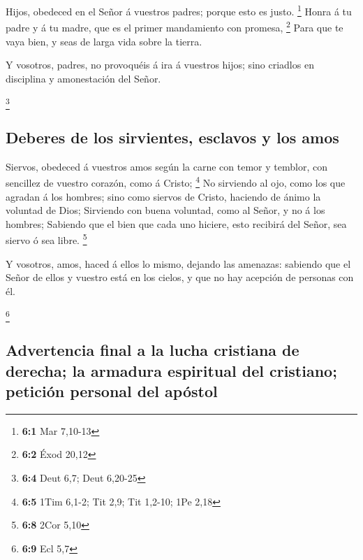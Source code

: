  Hijos, obedeced en el Señor á vuestros padres; porque esto
es justo. \footnote{\textbf{6:1} Mar 7,10-13}  Honra á tu
padre y á tu madre, que es el primer mandamiento con promesa,
\footnote{\textbf{6:2} Éxod 20,12}  Para que te vaya bien, y
seas de larga vida sobre la tierra.

 Y vosotros, padres, no provoquéis á ira á vuestros hijos;
sino criadlos en disciplina y amonestación del Señor.

\footnote{\textbf{6:4} Deut 6,7; Deut 6,20-25}

\hypertarget{deberes-de-los-sirvientes-esclavos-y-los-amos}{%
\subsection{Deberes de los sirvientes, esclavos y los
amos}\label{deberes-de-los-sirvientes-esclavos-y-los-amos}}

 Siervos, obedeced á vuestros amos según la carne con temor
y temblor, con sencillez de vuestro corazón, como á Cristo; \footnote{\textbf{6:5}
  1Tim 6,1-2; Tit 2,9; Tit 1,2-10; 1Pe 2,18}  No sirviendo
al ojo, como los que agradan á los hombres; sino como siervos de Cristo,
haciendo de ánimo la voluntad de Dios;  Sirviendo con buena
voluntad, como al Señor, y no á los hombres;  Sabiendo que
el bien que cada uno hiciere, esto recibirá del Señor, sea siervo ó sea
libre. \footnote{\textbf{6:8} 2Cor 5,10}

 Y vosotros, amos, haced á ellos lo mismo, dejando las
amenazas: sabiendo que el Señor de ellos y vuestro está en los cielos, y
que no hay acepción de personas con él.

\footnote{\textbf{6:9} Ecl 5,7}

\hypertarget{advertencia-final-a-la-lucha-cristiana-de-derecha-la-armadura-espiritual-del-cristiano-peticiuxf3n-personal-del-apuxf3stol}{%
\subsection{Advertencia final a la lucha cristiana de derecha; la
armadura espiritual del cristiano; petición personal del
apóstol}\label{advertencia-final-a-la-lucha-cristiana-de-derecha-la-armadura-espiritual-del-cristiano-peticiuxf3n-personal-del-apuxf3stol}}

